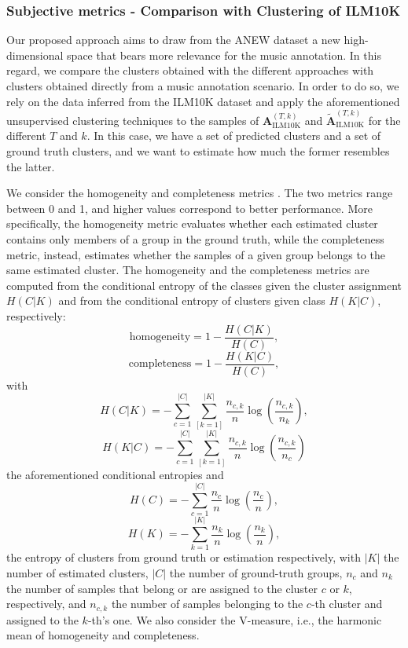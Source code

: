 \subsubsection{Subjective metrics - Comparison with Clustering of ILM10K}
\label{sec:ANEW:subILM10K_results}
Our proposed approach aims to draw from the ANEW dataset a new high-dimensional space that bears more relevance for the music annotation. In this regard, we compare the clusters obtained with the different approaches with clusters obtained directly from a music annotation scenario. In order to do so, we rely on the data inferred from the ILM10K dataset and apply the aforementioned unsupervised clustering techniques to the samples of $\mathbf{A}_{\text{ILM10K}}^{(T,k)}$ and $\mathbf{\tilde{A}}_{\text{ILM10K}}^{(T,k)}$ for the different $T$ and $k$. In this case, we have a set of predicted clusters and a set of ground truth clusters, and we want to estimate how much the former resembles the latter.  

We consider the homogeneity and completeness metrics \cite{rosenberg2007v}. The two metrics range between 0 and 1, and higher values correspond to better performance. More specifically, the homogeneity metric evaluates whether each estimated cluster contains only members of a group in the ground truth, while the completeness metric, instead, estimates whether the samples of a given group belongs to the same estimated cluster. The homogeneity and the completeness metrics are computed from the conditional entropy of the classes given the cluster assignment $H(C|K)$ and from the conditional entropy of clusters given class $H(K|C)$, respectively:
$$
	\text{homogeneity}=1-\frac{H(C|K)}{H(C)},
$$
$$
\text{completeness}=1-\frac{H(K|C)}{H(C)},
$$
with 
$$
H(C|K)=-\sum_{c=1}^{|C|}\sum_{[k=1]}^{|K|} \frac{n_{c,k}}{n} \log (\frac{n_{c,k}}{n_k}),
$$
$$
H(K|C)=-\sum_{c=1}^{|C|}\sum_{[k=1]}^{|K|} \frac{n_{c,k}}{n} \log (\frac{n_{c,k}}{n_c})
$$
the aforementioned conditional entropies and
$$
H(C)=-\sum_{c=1}^{|C|} \frac{n_c}{n} \log(\frac{n_c}{n}),
$$
$$
H(K)=-\sum_{k=1}^{|K|} \frac{n_k}{n} \log(\frac{n_k}{n}),
$$
the entropy of clusters from ground truth or estimation respectively, with $|K|$ the number of estimated clusters, $|C|$ the number of ground-truth groups, $n_c$ and $n_k$ the number of samples that belong or are assigned to the cluster $c$ or $k$, respectively, and $n_{c,k}$ the number of samples belonging to the $c$-th cluster and assigned to the $k$-th's one.
We also consider the V-measure, i.e., the harmonic mean of homogeneity and completeness. 

